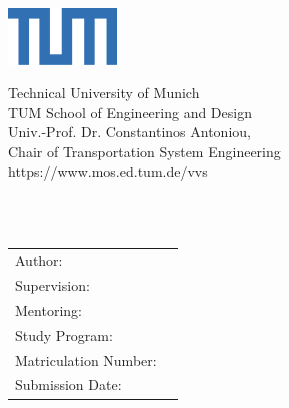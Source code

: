 
\begin{titlepage}
\begin{flushright}
    \includegraphics[height=15mm]{DefaultTemplate/Logos/TUM1.png}
\end{flushright}
    
\vspace{-25.5mm}
\begin{flushleft}
    \footnotesize{%
    Technical University of Munich\\
    TUM School of Engineering and Design\\
    Univ.-Prof. Dr. Constantinos Antoniou, \\
    Chair of Transportation System Engineering\\
    https://www.mos.ed.tum.de/vvs
    }
\end{flushleft}
\vspace{10mm}

\begin{flushleft}
  \vspace{30mm}
  {\huge\bfseries\getTitle{}}\\  
   \vspace{15mm}
   {\Large\getsubTitle{}}\\  
  
  \vspace{75mm}

    \begin{tabular}{l l}
Author:                     &\getAuthor{} \\
Supervision:                &\getSupervisor{} \\
Mentoring:                  &\getMentor{}\\
Study Program:              &\getCourseofStudy{} \\
Matriculation Number:       &\getAuthorMatrNr{}\\
Submission Date:            &\getSubmissionDate{} \\
    \end{tabular}
\end{flushleft}

\end{titlepage}
